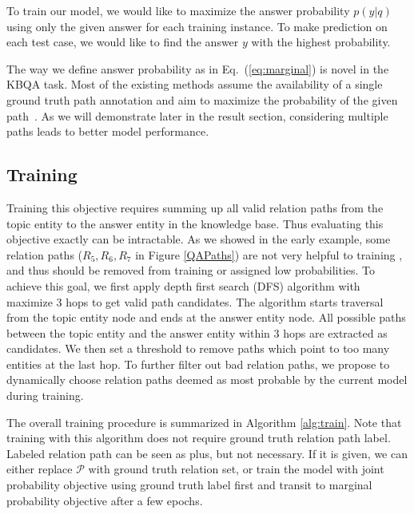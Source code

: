 To train our model, we would like to maximize the answer probability $p(y|q)$ using only the given answer for each training instance. To make prediction on each test case, we would like to find the answer $y$ with the highest probability.

The way we define answer probability as in Eq.~(\ref{eq:marginal}) is  novel in the KBQA task. Most of the existing methods assume the availability of a single ground truth path annotation and aim to maximize the probability of the given path~\cite{DBLP:conf/coling/ZhouHZ18}. As we will demonstrate later in the result section, considering multiple paths leads to better model performance.











\subsection{Training}

Training this objective requires summing up all valid relation paths from the topic entity to the answer entity in the knowledge base. Thus evaluating this objective exactly can be intractable. As we showed in the early example, some relation paths ($R_5, R_6, R_7$ in Figure \ref{QAPaths}) are not very helpful to training , and thus should be removed from training or assigned low probabilities. To achieve this goal, we first apply depth first search (DFS) algorithm with maximize 3 hops to get valid path candidates. The algorithm starts traversal from the topic entity node and ends at the answer entity node. All possible paths between the topic entity and the answer entity within 3 hops are extracted as candidates. We then set a threshold to remove paths which point to too many entities at the last hop. To further filter out bad relation paths, we propose to dynamically choose relation paths deemed as most probable by the current model during training.


 The overall training procedure is summarized in Algorithm \ref{alg:train}. Note that training with this algorithm does not require ground truth relation path label. Labeled relation path can be seen as plus, but not necessary. If it is given, we can either replace $\mathcal{P}$ with ground truth relation set, or train the model with joint probability objective using ground truth label first and transit to marginal probability objective after a few epochs.

